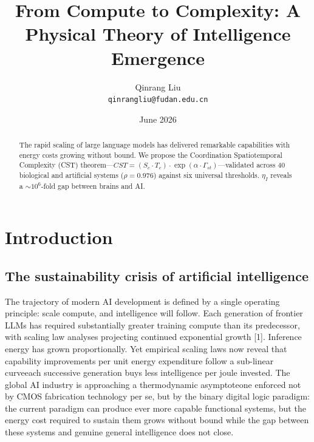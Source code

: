\documentclass[a4paper,12pt]{article}
\title{From Compute to Complexity: A Physical Theory of Intelligence Emergence}
\author{Qinrang Liu\\\texttt{qinrangliu@fudan.edu.cn}}
\date{June 2026}
\begin{document}
\maketitle

\begin{abstract}
The rapid scaling of large language models has delivered remarkable capabilities with energy costs growing without bound. We propose the Coordination Spatiotemporal Complexity (CST) theorem---$CST = (S_c \cdot T_c) \cdot \exp(\alpha \cdot \Gamma_{st})$---validated across 40 biological and artificial systems ($\rho = 0.976$) against six universal thresholds. $\eta_I$ reveals a $\sim10^6$-fold gap between brains and AI.
\end{abstract}

\section{Introduction}

\subsection{The sustainability crisis of artificial intelligence}


The trajectory of modern AI development is defined by a single operating principle: scale compute, and intelligence will follow. Each generation of frontier LLMs has required substantially greater training compute than its predecessor, with scaling law analyses projecting continued exponential growth [1]. Inference energy has grown proportionally. Yet empirical scaling laws now reveal that capability improvements per unit energy expenditure follow a sub-linear curveeach successive generation buys less intelligence per joule invested. The global AI industry is approaching a thermodynamic asymptoteone enforced not by CMOS fabrication technology per se, but by the binary digital logic paradigm: the current paradigm can produce ever more capable functional systems, but the energy cost required to sustain them grows without bound while the gap between these systems and genuine general intelligence does not close.
\end{document}

